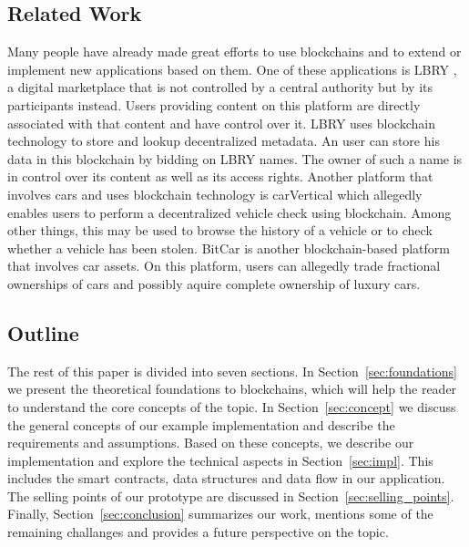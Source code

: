 \subsection{Related Work}
Many people have already made great efforts to use blockchains and to extend or implement new applications based on them. One of these applications is LBRY \cite{lbry}, a digital marketplace that is not controlled by a central authority but by its participants instead. Users providing content on this platform are directly associated with that content and have control over it. LBRY uses blockchain technology to store and lookup decentralized metadata. An user can store his data in this blockchain by bidding on LBRY names. The owner of such a name is in control over its content as well as its access rights. Another platform that involves cars and uses blockchain technology is carVertical \cite{carVertical} which allegedly enables users to perform a decentralized vehicle check using blockchain. Among other things, this may be used to browse the history of a vehicle or to check whether a vehicle has been stolen. BitCar \cite{BitCar} is another blockchain-based platform that involves car assets. On this platform, users can allegedly trade fractional ownerships of cars and possibly aquire complete ownership of luxury cars.

\subsection{Outline}
The rest of this paper is divided into seven sections. In Section~\ref{sec:foundations} we present the theoretical foundations to blockchains, which will help the reader to understand the core concepts of the topic. In Section~\ref{sec:concept} we discuss the general concepts of our example implementation and describe the requirements and assumptions. Based on these concepts, we describe our implementation and explore the technical aspects  in Section~\ref{sec:impl}. This includes the smart contracts, data structures and data flow in our application. The selling points of our prototype are discussed in Section~\ref{sec:selling_points}.
Finally, Section~\ref{sec:conclusion} summarizes our work, mentions some of the remaining challanges and provides a future perspective on the topic.
